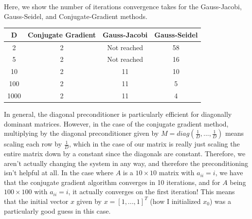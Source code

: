 \documentclass{article}
\begin{document}
Here, we show the number of iterations convergence takes for the Gauss-Jacobi, Gauss-Seidel, and Conjugate-Gradient methods. 

\begin{center}
   \begin{tabular}{|c|c|c|c|}
      \hline
      D & Conjugate Gradient & Gauss-Jacobi & Gauss-Seidel\\
      \hline
      2 & 2 & Not reached & 58 \\ 
      \hline
      5 & 2 & Not reached & 16 \\ 
      \hline
      10 & 2 & 11 & 10 \\ 
      \hline
      100 & 2 & 11 & 5 \\
      \hline
      1000 & 2 & 11 & 4 \\
      \hline
   \end{tabular}
\end{center}

In general, the diagonal preconditioner is particularly efficient for diagonally dominant matrices. However, in the case of the conjugate gradient method, multiplying by the diagonal preconditioner given by $M = diag(\frac{1}{D},...,\frac{1}{D})$ means scaling each row by $\frac{1}{D}$, which in the case of our matrix is really just scaling the entire matrix down by a constant since the diagonals are constant. Therefore, we aren't actually changing the system in any way, and therefore the preconditioning isn't helpful at all. In the case where $A$ is a $10 \times 10$ matrix with $a_{ii} = i$, we have that the conjugate gradient algorithm converges in 10 iterations, and for $A$ being $100 \times 100$ with $a_{ii} = i$, it actually converges on the first iteration! This means that the initial vector $x$ given by $x=[1,...,1]^T$ (how I initialized $x_0$) was a particularly good guess in this case. \\
\end{document}
